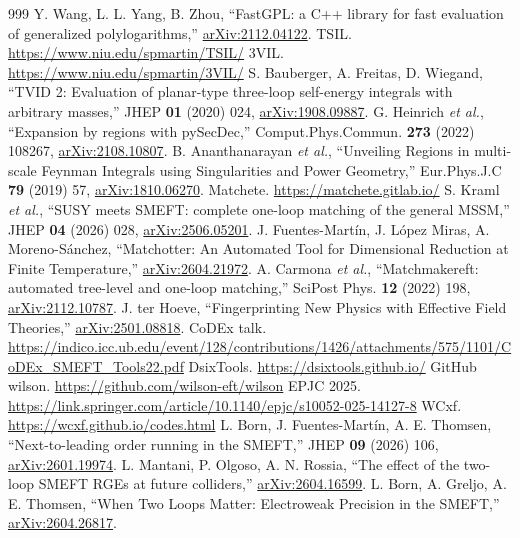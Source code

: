\documentclass[a4paper,10pt]{ltjsarticle}
\begin{document}
\begin{thebibliography}{999}
 Y. Wang, L. L. Yang, B. Zhou, ``FastGPL: a C++ library for fast evaluation of generalized polylogarithms,'' \href{https://arxiv.org/abs/2112.04122}{arXiv:2112.04122}.
 TSIL. \url{https://www.niu.edu/spmartin/TSIL/}
 3VIL. \url{https://www.niu.edu/spmartin/3VIL/}
 S. Bauberger, A. Freitas, D. Wiegand, ``TVID 2: Evaluation of planar-type three-loop self-energy integrals with arbitrary masses,'' JHEP \textbf{01} (2020) 024, \href{https://arxiv.org/abs/1908.09887}{arXiv:1908.09887}.
 G. Heinrich \textit{et al.}, ``Expansion by regions with pySecDec,'' Comput.Phys.Commun. \textbf{273} (2022) 108267, \href{https://arxiv.org/abs/2108.10807}{arXiv:2108.10807}.
 B. Ananthanarayan \textit{et al.}, ``Unveiling Regions in multi-scale Feynman Integrals using Singularities and Power Geometry,'' Eur.Phys.J.C \textbf{79} (2019) 57, \href{https://arxiv.org/abs/1810.06270}{arXiv:1810.06270}.
 Matchete. \url{https://matchete.gitlab.io/}
 S. Kraml \textit{et al.}, ``SUSY meets SMEFT: complete one-loop matching of the general MSSM,'' JHEP \textbf{04} (2026) 028, \href{https://arxiv.org/abs/2506.05201}{arXiv:2506.05201}.
 J. Fuentes-Martín, J. López Miras, A. Moreno-Sánchez, ``Matchotter: An Automated Tool for Dimensional Reduction at Finite Temperature,'' \href{https://arxiv.org/abs/2604.21972}{arXiv:2604.21972}.
 A. Carmona \textit{et al.}, ``Matchmakereft: automated tree-level and one-loop matching,'' SciPost Phys. \textbf{12} (2022) 198, \href{https://arxiv.org/abs/2112.10787}{arXiv:2112.10787}.
 J. ter Hoeve, ``Fingerprinting New Physics with Effective Field Theories,'' \href{https://arxiv.org/abs/2501.08818}{arXiv:2501.08818}.
 CoDEx talk. \url{https://indico.icc.ub.edu/event/128/contributions/1426/attachments/575/1101/CoDEx_SMEFT_Tools22.pdf}
 DsixTools. \url{https://dsixtools.github.io/}
 GitHub wilson. \url{https://github.com/wilson-eft/wilson}
 EPJC 2025. \url{https://link.springer.com/article/10.1140/epjc/s10052-025-14127-8}
 WCxf. \url{https://wcxf.github.io/codes.html}
 L. Born, J. Fuentes-Martín, A. E. Thomsen, ``Next-to-leading order running in the SMEFT,'' JHEP \textbf{09} (2026) 106, \href{https://arxiv.org/abs/2601.19974}{arXiv:2601.19974}.
 L. Mantani, P. Olgoso, A. N. Rossia, ``The effect of the two-loop SMEFT RGEs at future colliders,'' \href{https://arxiv.org/abs/2604.16599}{arXiv:2604.16599}.
 L. Born, A. Greljo, A. E. Thomsen, ``When Two Loops Matter: Electroweak Precision in the SMEFT,'' \href{https://arxiv.org/abs/2604.26817}{arXiv:2604.26817}.

\end{thebibliography}
\end{document}
